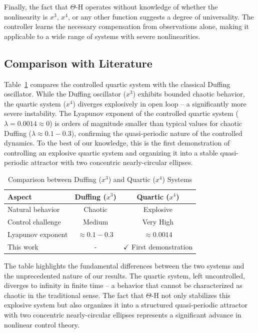 \documentclass[twocolumn]{article}
\begin{document}
Finally, the fact that $\Theta$-H operates without knowledge of whether 
the nonlinearity is $x^3$, $x^4$, or any other function suggests a 
degree of universality. The controller learns the necessary compensation 
from observations alone, making it applicable to a wide range of systems 
with severe nonlinearities.

\subsection{Comparison with Literature}

Table~\ref{tab:comparison} compares the controlled quartic system 
with the classical Duffing oscillator. While the Duffing oscillator 
($x^3$) exhibits bounded chaotic behavior, the quartic system ($x^4$) 
diverges explosively in open loop -- a significantly more severe 
instability. The Lyapunov exponent of the controlled quartic system 
($\lambda = 0.0014 \approx 0$) is orders of magnitude smaller than 
typical values for chaotic Duffing ($\lambda \approx 0.1-0.3$), 
confirming the quasi-periodic nature of the controlled dynamics. 
To the best of our knowledge, this is the first demonstration of 
controlling an explosive quartic system and organizing it into a 
stable quasi-periodic attractor with two concentric nearly-circular 
ellipses.
\begin{table}[htb]
\centering
\caption{Comparison between Duffing ($x^3$) and Quartic ($x^4$) Systems}
\label{tab:comparison}
{\small
\begin{tabular}{|l|c|c|}
\hline
\textbf{Aspect} & \textbf{Duffing ($x^3$)} & \textbf{Quartic ($x^4$)} \\
\hline
Natural behavior & Chaotic & Explosive \\
\hline
Control challenge & Medium & Very High \\
\hline
Lyapunov exponent & $\approx 0.1-0.3$ & $\approx 0.0014$ \\
\hline
This work & - & $\checkmark$ First demonstration \\
\hline
\end{tabular}
}
\end{table}
The table highlights the fundamental differences between the two 
systems and the unprecedented nature of our results. The quartic 
system, left uncontrolled, diverges to infinity in finite time -- 
a behavior that cannot be characterized as chaotic in the traditional 
sense. The fact that $\Theta$-H not only stabilizes this explosive 
system but also organizes it into a structured quasi-periodic 
attractor with two concentric nearly-circular ellipses represents 
a significant advance in nonlinear control theory.
\end{document}
